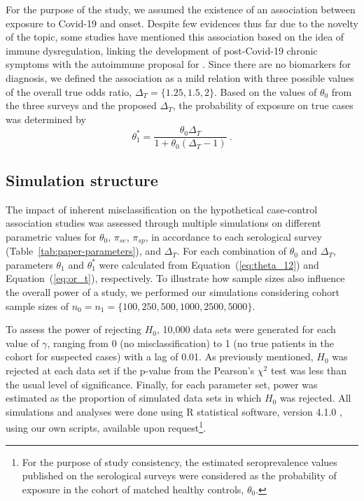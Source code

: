 For the purpose of the study, we assumed the existence of an association between exposure to Covid-19 and \cfs onset. Despite few evidences thus far due to the novelty of the topic, some studies have mentioned this association based on the idea of immune dysregulation, linking the development of post-Covid-19 chronic symptoms with the autoimmune proposal for \cfs \citep{sotznyMyalgicEncephalomyelitisChronic2018}. Since there are no biomarkers for \cfs diagnosis, we defined the association as a mild relation with three possible values of the overall true odds ratio, $\Delta_T = \{1.25, 1.5, 2\}$. Based on the values of $\theta_0$ from the three surveys and the proposed $\Delta_T$, the probability of exposure on true \cfs cases was determined by
% 
\begin{equation}
    \theta_1^* = \frac{\theta_0\Delta_T}{1 + \theta_0 \left(\Delta_T - 1\right)}\ .
    \label{eq:or_t}
\end{equation}

\subsection{Simulation structure}

The impact of inherent misclassification on the hypothetical case-control association studies was assessed through multiple simulations on different parametric values for $\theta_0$, $\pi_{se}$, $\pi_{sp}$, in accordance to each serological survey (Table~\ref{tab:paper-parameters}), and $\Delta_T$. For each combination of $\theta_0$ and $\Delta_T$, parameters $\theta_1$ and $\theta_1^*$ were calculated from Equation~(\ref{eq:theta_12}) and Equation~(\ref{eq:or_t}), respectively. To illustrate how sample sizes also influence the overall power of a study, we performed our simulations considering cohort sample sizes of $n_0 = n_1 = \{100, 250, 500, 1000, 2500, 5000\}$.

To assess the power of rejecting $H_0$, 10,000 data sets were generated for each value of $\gamma$, ranging from 0 (no misclassification) to 1 (no true \cfs patients in the cohort for suspected cases) with a lag of 0.01. As previously mentioned, $H_0$ was rejected at each data set if the p-value from the Pearson's $\chi^2$ test was less than the usual level of significance. Finally, for each parameter set, power was estimated as the proportion of simulated data sets in which $H_0$ was rejected.%
All simulations and analyses were done using R statistical software, version 4.1.0 \citep{rcoreteamLanguageEnvironmentStatistical2020}, using our own scripts, available upon request\footnote{For the purpose of study consistency, the estimated seroprevalence values published on the serological surveys were considered as the probability of exposure in the cohort of matched healthy controls, $\theta_0$.}.

